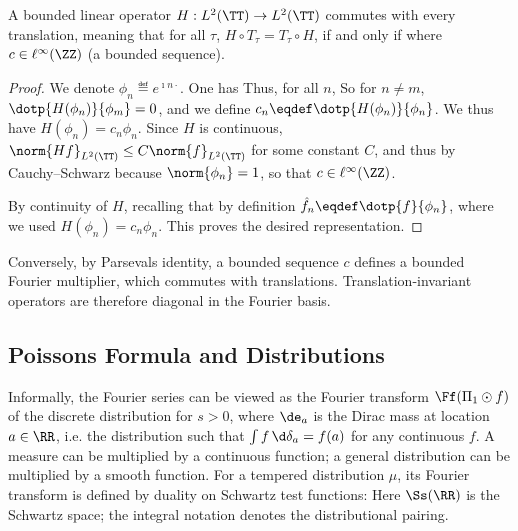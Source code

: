 \begin{prop}\label{prop-ti-convol-l2}
	A bounded linear operator $H : L^2(\TT) \rightarrow L^2(\TT)$ commutes with every translation, meaning that for all $\tau$, $H \circ T_\tau = T_\tau \circ H$, if and only if
	where $c \in \ell^\infty(\ZZ)$ (a bounded sequence).
\end{prop}
\begin{proof}
	We denote $\phi_n \eqdef e^{\imath n \cdot}$. 
	One has
	Thus, for all $n$, 
	So for $n \neq m$, $\dotp{H(\phi_n)}{\phi_m} = 0$, and we define $c_n \eqdef \dotp{H(\phi_n)}{\phi_n}$.
	We thus have $H(\phi_n) = c_n \phi_n$.
	Since $H$ is continuous, $\norm{Hf}_{L^2(\TT)} \leq C \norm{f}_{L^2(\TT)}$ for some constant $C$, and thus
	by Cauchy--Schwarz
	because $\norm{\phi_n}=1$, so that $c \in \ell^\infty(\ZZ)$.
	 
	By continuity of $H$, recalling that by definition $\hat f_n \eqdef \dotp{f}{\phi_n}$, 
	where we used $H(\phi_n) = c_n \phi_n$. This proves the desired representation.
\end{proof}

Conversely, by Parseval\textquotesingle s identity, a bounded sequence $c$ defines a bounded Fourier multiplier, which commutes with translations. Translation-invariant operators are therefore diagonal in the Fourier basis.

                                                
\subsection{Poisson\textquotesingle s Formula and Distributions}

Informally, the Fourier series
can be viewed as the Fourier transform $\Ff( \Pi_1 \odot f )$ of the discrete distribution
for $s>0$,
where $\de_a$ is the Dirac mass at location $a \in \RR$, i.e. the distribution such that $\int f\,\d\delta_a=f(a)$ for any continuous $f$. A measure can be multiplied by a continuous function; a general distribution can be multiplied by a smooth function. For a tempered distribution $\mu$, its Fourier transform is defined by duality on Schwartz test functions:
Here $\Ss(\RR)$ is the Schwartz space; the integral notation denotes the distributional pairing.

